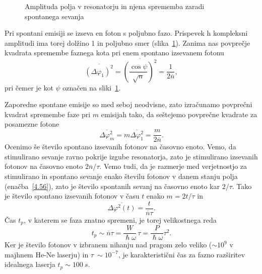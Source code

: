 \begin{figure}[ht]
\centering
\def\svgwidth{70truemm} 

\caption{Amplituda polja v resonatorju in njena sprememba zaradi 
spontanega sevanja}
\label{fig:fazor}
\end{figure}

Pri spontani emisiji se izseva en foton s poljubno fazo. Prispevek h kompleksni
amplitudi ima torej dolžino 1 in poljubno smer (slika~\ref{fig:fazor}). Zanima
nas povprečje kvadrata spremembe faznega kota pri enem spontano izsevanem fotonu
\begin{equation}
\overline{(\Delta \varphi_{1})^{2}}=\overline{\left(\frac{\cos\psi}{\sqrt{n} }\right)^2}
=\frac{1}{2\overline{n}},
\label{5.17}
\end{equation}
pri čemer je kot $\psi$ označen na sliki~\ref{fig:fazor}. 

Zaporedne spontane emisije so med seboj neodvisne, zato izračunamo
povprečni kvadrat spremembe faze pri $m$ emisijah tako, da seštejemo
povprečne kvadrate za posamezne fotone 
\begin{equation}
\overline{\Delta \varphi_{m}^{2}}=m\overline{\Delta \varphi_{1}^{2}}=
\frac{m}{2\overline{n}}.
\label{5.18}
\end{equation}
Ocenimo še število spontano izsevanih fotonov na časovno enoto.
Vemo, da stimulirano sevanje ravno pokrije izgube resonatorja, zato je
stimulirano izsevanih fotonov na časovno enoto $2\overline{n}/\tau $. Vemo tudi, 
da je razmerje med verjetnostjo za stimulirano in spontano sevanje enako 
številu fotonov v danem stanju polja (enačba~\ref{4.56}), zato je število 
spontanih sevanj na časovno enoto kar $2/\tau $.
Tako je število spontano izsevanih fotonov v času $t$ enako $m=2t/\tau $ in 
\begin{equation}
\overline{\Delta \varphi^{2}(t)}=\frac{t}{\overline{n}\tau }.
\label{5.19}
\end{equation}
Čas $t_{p}$, v katerem se faza znatno spremeni, je torej
velikostnega reda 
\begin{equation}
t_{p}\sim \overline{n}\tau =\frac{W}{\hslash \omega }\,\tau =\frac{P}{\hslash
\omega }\tau ^{2}.
\label{5.20}
\end{equation}
Ker je število fotonov v izbranem nihanju nad pragom zelo veliko ($\sim 10^9$ v majhnem 
He-Ne laserju) in $\tau~\sim 10^{-7}$, je karakteristični
čas za fazno razširitev idealnega laserja $t_p \sim 100~\si{s}$. 

